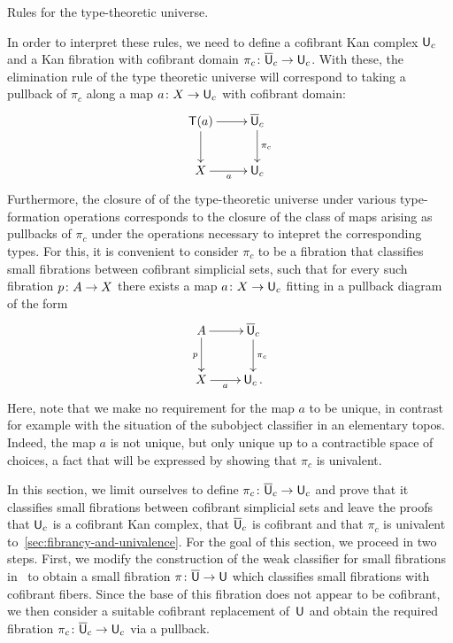 \documentclass[reqno,10pt,a4paper,oneside,draft]{amsart}
\begin{document}
\begin{table}[htb]
\smallskip
\caption{Rules for the type-theoretic universe.} 
\label{tab:U-type}
\end{table}

In order to interpret these rules, we need to define a cofibrant Kan complex $\mathsf{U}_c$ and a Kan 
fibration with cofibrant domain $\pi_c \colon \overline{\mathsf{U}}_c \to \mathsf{U}_c$. With these, the elimination rule of the
type theoretic universe will correspond to taking a pullback of $\pi_c$ along a map $a \colon X
\to \mathsf{U}_c$ with cofibrant domain:
\[
\xymatrix{
\mathsf{T}(a) \ar[d] \ar[r] & \UU_c \ar[d]^{\pi_c} \\
X \ar[r]_a & \U_c}
\]
Furthermore, the closure of of the type-theoretic universe under various type-formation operations
corresponds to the closure of the class of maps arising as pullbacks of $\pi_c$ under the 
operations necessary to intepret the corresponding types. For this, it is convenient to consider
$\pi_c$ to be a fibration that classifies small fibrations between cofibrant simplicial
sets, \ie such that for every such fibration $p \colon A \to X$ there exists a map $a \colon X \to \mathsf{U}_c$ fitting in a pullback diagram of the form
\[
\xymatrix{
A \ar[r] \ar[d]_p   & \UU_c \ar[d]^{\pi_c} \\
X \ar[r]_-a &  \U_c \, .}
\]
Here, note that we make no requirement for
the map $a$ to be unique, in contrast for example with the situation of the subobject classifier
in an elementary topos. Indeed, the map $a$ is not unique, but only unique  up to a contractible space
of choices, a fact that will be expressed by showing that $\pi_c$ is univalent. 

In this section, we limit ourselves to define $\pi_c \colon \overline{\mathsf{U}}_c \to \mathsf{U}_c$ and prove that it
classifies small fibrations between cofibrant simplicial sets and leave the proofs
that $\mathsf{U}_c$ is a cofibrant Kan complex, that $\overline{\mathsf{U}}_c$ is cofibrant  and that $\pi_c$ is univalent 
 to~\cref{sec:fibrancy-and-univalence}. For the goal of this section, we proceed in two steps. First, we modify  the construction of the weak classifier for small fibrations in~\cite{voevodsky-simplicial-model} to obtain a small fibration $\pi \colon \overline{\mathsf{U}} \to \mathsf{U}$ which classifies small fibrations with cofibrant fibers. Since the base of this fibration does not appear to be cofibrant,
we then consider a suitable cofibrant replacement  of~$\mathsf{U}$ and obtain the required fibration $\pi_c \colon \overline{\mathsf{U}}_c \to \mathsf{U}_c$ via a pullback. 
\end{document}
